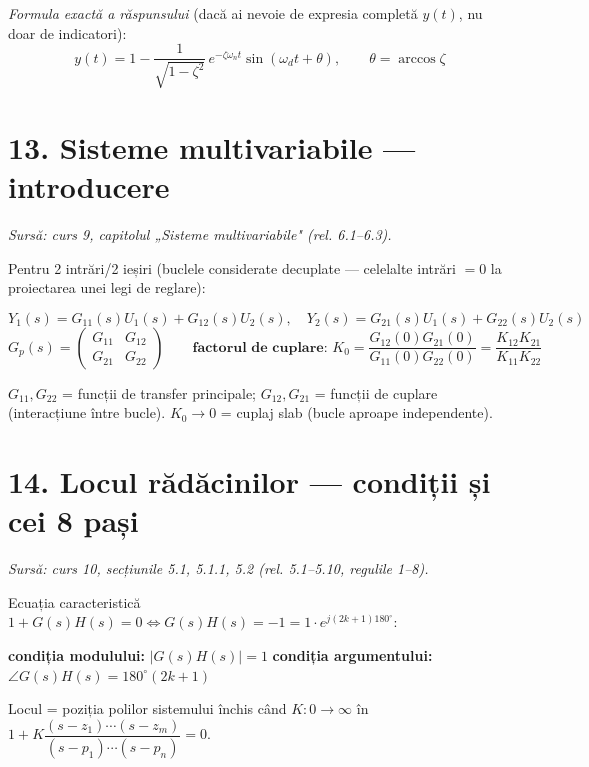 \documentclass[10pt,a4paper]{article}
\newcommand{\srcnote}[1]{{\footnotesize\color{gray!55!black}\textit{Sursă: #1}}\par}
\begin{document}
\textit{Formula exactă a răspunsului} (dacă ai nevoie de expresia completă $y(t)$, nu doar de indicatori):
$$y(t)=1-\dfrac1{\sqrt{1-\zeta^2}}\,e^{-\zeta\omega_nt}\sin(\omega_dt+\theta),\qquad \theta=\arccos\zeta$$

\section*{13. Sisteme multivariabile — introducere}\label{sec:13}
\srcnote{curs 9, capitolul „Sisteme multivariabile" (rel. 6.1–6.3).}
Pentru 2 intrări/2 ieșiri (buclele considerate decuplate — celelalte intrări $=0$ la proiectarea unei legi de reglare):
\begin{keyeq}\color{red!65!black}
$$Y_1(s)=G_{11}(s)U_1(s)+G_{12}(s)U_2(s),\quad Y_2(s)=G_{21}(s)U_1(s)+G_{22}(s)U_2(s)$$
$$G_p(s)=\begin{pmatrix}G_{11}&G_{12}\\G_{21}&G_{22}\end{pmatrix}\qquad \textbf{factorul de cuplare: } K_0=\dfrac{G_{12}(0)G_{21}(0)}{G_{11}(0)G_{22}(0)}=\dfrac{K_{12}K_{21}}{K_{11}K_{22}}$$
\end{keyeq}
$G_{11},G_{22}$ = funcții de transfer principale; $G_{12},G_{21}$ = funcții de cuplare (interacțiune între bucle). $K_0\to0$ = cuplaj slab (bucle aproape independente).

\section*{14. Locul rădăcinilor — condiții și cei 8 pași}\label{sec:14}
\srcnote{curs 10, secțiunile 5.1, 5.1.1, 5.2 (rel. 5.1–5.10, regulile 1–8).}
Ecuația caracteristică $1+G(s)H(s)=0\Leftrightarrow G(s)H(s)=-1=1\cdot e^{j(2k+1)180^\circ}$:
\begin{keyeq}\color{red!65!black}
\textbf{condiția modulului:} $|G(s)H(s)|=1$ \qquad \textbf{condiția argumentului:} $\angle G(s)H(s)=180^\circ(2k+1)$
\end{keyeq}
Locul = poziția polilor sistemului închis când $K:0\to\infty$ în $1+K\dfrac{(s-z_1)\cdots(s-z_m)}{(s-p_1)\cdots(s-p_n)}=0$.
\end{document}
